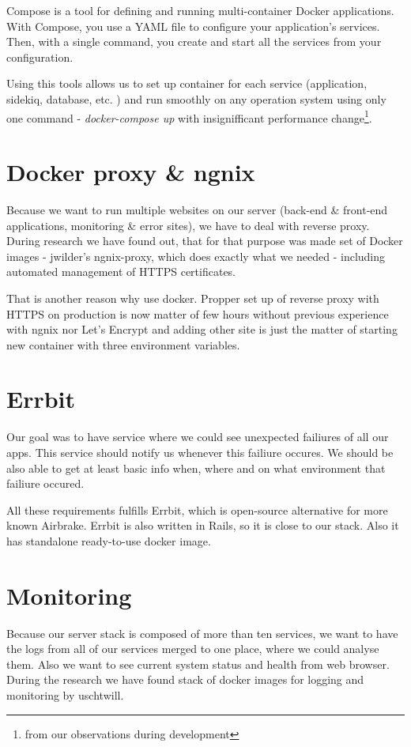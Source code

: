 Compose is a tool for defining and running multi-container Docker applications. With Compose, you use a YAML file to configure your application’s services. Then, with a single command, you create and start all the services from your configuration.\cite{docker_compose_def}

Using this tools allows us to set up container for each service (application, sidekiq, database, etc. ) and run smoothly on any operation system using only one command - \textit{docker-compose up} with insignifficant performance change\footnote{from our observations during development}.

\section{Docker proxy \& ngnix}
Because we want to run multiple websites on our server (back-end \& front-end applications, monitoring \& error sites), we have to deal with reverse proxy. During research we have found out, that for that purpose was made set of Docker images - jwilder's ngnix-proxy, which does exactly what we needed - including automated management of HTTPS certificates. 

That is another reason why use docker. Propper set up of reverse proxy with HTTPS on production is now matter of few hours without previous experience with ngnix nor Let's Encrypt and adding other site is just the matter of starting new container with three environment variables.

\section{Errbit}
Our goal was to have service where we could see unexpected failiures of all our apps. This service should notify us whenever this failiure occures. We should be also able to get at least basic info when, where and on what environment that failiure occured.

All these requirements fulfills Errbit, which is open-source alternative for more known Airbrake. Errbit is also written in Rails, so it is close to our stack. Also it has standalone ready-to-use docker image. 

\section{Monitoring}
Because our server stack is composed of more than ten services, we want to have the logs from all of our services merged to one place, where we could analyse them. Also we want to see current system status and health from web browser. During the research we have found stack of docker images for logging and monitoring by uschtwill. 

